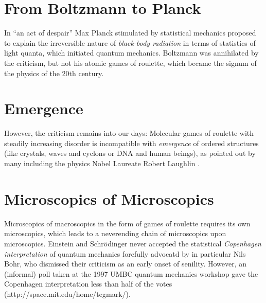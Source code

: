 \section{From Boltzmann to Planck}
In ``an act of despair'' Max Planck 
stimulated by statistical mechanics proposed to explain the irreversible 
nature of \emph{black-body radiation} in terms of statistics of 
light quanta, which initiated quantum mechanics. Boltzmann was annihilated 
by the criticism,
but not his atomic games of roulette, which became the signum
of the physics of the 20th century.

\section{Emergence}

However, the criticism remains into our days: Molecular games of roulette with steadily 
increasing disorder
is incompatible with \emph{emergence} of ordered structures (like crystals,
waves and cyclons or DNA and human beings), as pointed out
by many including the physics Nobel Laureate Robert 
Laughlin \cite{laughlin}. 

\section{Microscopics of Microscopics}

Microscopics of macroscopics in the 
form of games of roulette requires its own microscopics,
which leads to a neverending chain of microscopics upon microscopics.
Einstein and Schr\"odinger never accepted the statistical 
\emph{Copenhagen interpretation} of quantum mechanics forefully 
advocatd by in particular Nils Bohr, who dismissed their criticism 
as an early onset of senility. However, an (informal) poll taken at the 1997 
UMBC quantum mechanics workshop gave the Copenhagen interpretation 
less than half of the votes (http://space.mit.edu/home/tegmark/).



